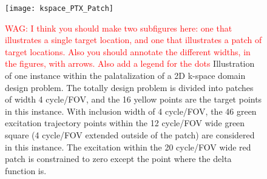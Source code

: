 
\begin{figure}
	\centering
	\texttt{[image: kspace\_PTX\_Patch]}
	\caption{\textcolor{red}{WAG: I think you should make two subfigures here: one that illustrates a single target location, and one that illustrates a patch of target locations. Also you should annotate the different widths, in the figures, with arrows. Also add a legend for the dots} 
	Illustration of one instance within the palatalization of a 2D k-space domain design problem. The totally design problem is divided into patches of width 4 cycle/FOV, and the 16 yellow points are the target points in this instance. With inclusion width of 4 cycle/FOV, the 46 green excitation trajectory points within the 12 cycle/FOV wide green square (4 cycle/FOV extended outside of the patch) are considered in this instance. The excitation within the 20 cycle/FOV wide red patch is constrained to zero except the point where the delta function is.}
	\label{fig:Patch}
\end{figure}

